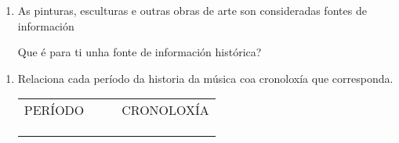\begin{multicols}{2}
\begin{ejercicio}
\begin{enumerate}[1)]
  \begin{enumerate}[1.]
   \item \dotfill 
   \item \dotfill 
   \item \dotfill 
   \item \dotfill 
  \end{enumerate}
 
 \item
 As pinturas, esculturas e outras obras de arte son consideradas fontes de información \par
 \dotfill
 \par
 Que é para ti unha fonte de información histórica?
 \par \vspace*{2.8cm}
 \end{enumerate}
\end{ejercicio}
%
\end{multicols}


\begin{ejercicio}
 \begin{enumerate}[1)]
  \item 
  Relaciona cada período da historia da música coa cronoloxía que corresponda.
  \par

\begin{center}
\begin{tabular}{llll}


PERÍODO &  &  & CRONOLOXÍA \\ 
        &  &  &            \\
        &  &  &            \\
        &  &  &            \\ 


\end{tabular}
\end{center}

\end{enumerate}
\end{ejercicio}
%


